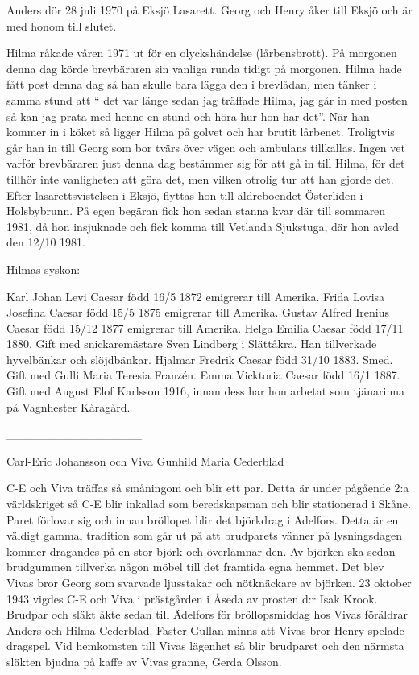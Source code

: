 Anders dör 28 juli 1970 på Eksjö Lasarett. Georg och Henry åker till Eksjö och är med honom till slutet.




Hilma råkade våren 1971 ut för en olyckshändelse (lårbensbrott). På morgonen denna dag körde brevbäraren sin vanliga runda tidigt på morgonen. Hilma hade fått post denna dag så han skulle bara lägga den i brevlådan, men tänker i samma stund att “ det var länge sedan jag träffade Hilma, jag går in med posten så kan jag prata med henne en stund och höra hur hon har det”. När han kommer in i köket så ligger Hilma på golvet och har brutit lårbenet. Troligtvis går han in till Georg som bor tvärs över vägen och ambulans tillkallas. Ingen vet varför brevbäraren just denna dag bestämmer sig för att gå in till Hilma, för det tillhör inte vanligheten att göra det, men vilken otrolig tur att han gjorde det. Efter lasarettsvistelsen i Eksjö, flyttas hon till äldreboendet Österliden i Holsbybrunn. På egen begäran fick hon sedan stanna kvar där till sommaren 1981, då hon insjuknade och fick komma till Vetlanda Sjukstuga, där hon avled den 12/10 1981.








Hilmas syskon:


Karl Johan Levi Caesar född 16/5 1872 emigrerar till Amerika.
Frida Lovisa Josefina Caesar född 15/5 1875 emigrerar till Amerika.
Gustav Alfred Irenius Caesar född 15/12 1877 emigrerar till Amerika.
Helga Emilia Caesar född 17/11 1880. Gift med snickaremästare Sven Lindberg i Slättåkra. Han tillverkade hyvelbänkar och slöjdbänkar.
Hjalmar Fredrik Caesar född 31/10 1883. Smed. Gift med Gulli Maria Teresia Franzén.
Emma Vicktoria Caesar född 16/1 1887. Gift med August Elof Karlsson 1916, innan dess har hon arbetat som tjänarinna  på Vagnhester Kåragård.


________________


Carl-Eric Johansson och Viva Gunhild Maria Cederblad




C-E och Viva träffas så småningom och blir ett par. Detta är under pågående 2:a världskriget så C-E blir inkallad som beredskapsman och blir stationerad i Skåne. Paret förlovar sig och innan bröllopet blir det björkdrag i Ädelfors. Detta är en väldigt gammal tradition som går ut på att brudparets vänner på lysningsdagen kommer dragandes på en stor björk och överlämnar den. Av björken ska sedan brudgummen tillverka någon möbel till det framtida egna hemmet. Det blev Vivas bror Georg som svarvade ljusstakar och nötknäckare av björken.
23 oktober 1943 vigdes C-E och Viva i prästgården i Åseda av prosten d:r Isak Krook. Brudpar och släkt åkte sedan till Ädelfors för bröllopsmiddag hos Vivas föräldrar Anders och Hilma Cederblad. Faster Gullan minns att Vivas bror Henry spelade dragspel. Vid hemkomsten till Vivas lägenhet så blir brudparet och den närmsta släkten bjudna på kaffe av Vivas granne, Gerda Olsson.


